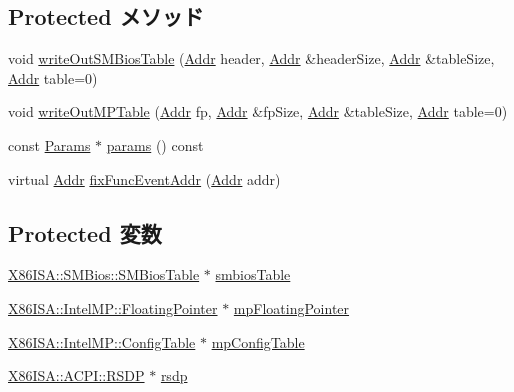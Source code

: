\subsection*{Protected メソッド}
\begin{DoxyCompactItemize}
\item 
void \hyperlink{classX86System_aedc3044b917a61fa913215abf8d2840a}{writeOutSMBiosTable} (\hyperlink{base_2types_8hh_af1bb03d6a4ee096394a6749f0a169232}{Addr} header, \hyperlink{base_2types_8hh_af1bb03d6a4ee096394a6749f0a169232}{Addr} \&headerSize, \hyperlink{base_2types_8hh_af1bb03d6a4ee096394a6749f0a169232}{Addr} \&tableSize, \hyperlink{base_2types_8hh_af1bb03d6a4ee096394a6749f0a169232}{Addr} table=0)
\item 
void \hyperlink{classX86System_ac86acd47948194bfedd9cf4f63400d2a}{writeOutMPTable} (\hyperlink{base_2types_8hh_af1bb03d6a4ee096394a6749f0a169232}{Addr} fp, \hyperlink{base_2types_8hh_af1bb03d6a4ee096394a6749f0a169232}{Addr} \&fpSize, \hyperlink{base_2types_8hh_af1bb03d6a4ee096394a6749f0a169232}{Addr} \&tableSize, \hyperlink{base_2types_8hh_af1bb03d6a4ee096394a6749f0a169232}{Addr} table=0)
\item 
const \hyperlink{classX86System_a4f3142e3ba81ac1e14e960636ad3202b}{Params} $\ast$ \hyperlink{classX86System_acd3c3feb78ae7a8f88fe0f110a718dff}{params} () const 
\item 
virtual \hyperlink{base_2types_8hh_af1bb03d6a4ee096394a6749f0a169232}{Addr} \hyperlink{classX86System_aff94f650c5eef23b8dc350ea755bdef4}{fixFuncEventAddr} (\hyperlink{base_2types_8hh_af1bb03d6a4ee096394a6749f0a169232}{Addr} addr)
\end{DoxyCompactItemize}
\subsection*{Protected 変数}
\begin{DoxyCompactItemize}
\item 
\hyperlink{classX86ISA_1_1SMBios_1_1SMBiosTable}{X86ISA::SMBios::SMBiosTable} $\ast$ \hyperlink{classX86System_a5c04c44b233a4eb2f0b5257fbf325a16}{smbiosTable}
\item 
\hyperlink{classX86ISA_1_1IntelMP_1_1FloatingPointer}{X86ISA::IntelMP::FloatingPointer} $\ast$ \hyperlink{classX86System_ae6f1d27ec00245a1760fbadd3c288f27}{mpFloatingPointer}
\item 
\hyperlink{classX86ISA_1_1IntelMP_1_1ConfigTable}{X86ISA::IntelMP::ConfigTable} $\ast$ \hyperlink{classX86System_a9330926e79494dca3485ba60e2fe27d4}{mpConfigTable}
\item 
\hyperlink{classX86ISA_1_1ACPI_1_1RSDP}{X86ISA::ACPI::RSDP} $\ast$ \hyperlink{classX86System_a267601a08962af9107c6f7c533d4461d}{rsdp}
\end{DoxyCompactItemize}



